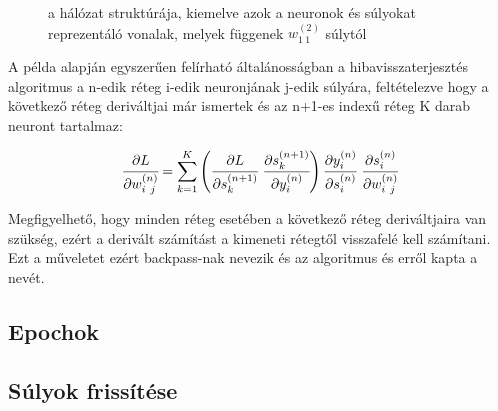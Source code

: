 \begin{figure}[H]
	\caption{a hálózat struktúrája, kiemelve azok a neuronok és súlyokat reprezentáló vonalak, melyek függenek $w^{(2)}_{1~1}$ súlytól \label{w221}}
\end{figure}

A példa alapján egyszerűen felírható általánosságban a hibavisszaterjesztés algoritmus a n-edik réteg i-edik neuronjának j-edik súlyára, feltételezve hogy a következő réteg deriváltjai már ismertek és az n+1-es indexű réteg K darab neuront tartalmaz:

\begin{equation}
    \cfrac{\partial L}{\partial w^{(n)}_{i~j}} = \sum^{K}_{k=1} \left(\cfrac{\partial L}{\partial s^{(n+1)}_k}~\cfrac{\partial s^{(n+1)}_k}{\partial y^{(n)}_i}\right) \cfrac{\partial y^{(n)}_i}{\partial s^{(n)}_i}~\cfrac{\partial s^{(n)}_i}{\partial w^{(n)}_{i~j}} 
\end{equation}

Megfigyelhető, hogy minden réteg esetében a következő réteg deriváltjaira van szükség, ezért a derivált számítást a kimeneti rétegtől visszafelé kell számítani. Ezt a műveletet ezért backpass-nak nevezik és az algoritmus és erről kapta a nevét.

\subsection{Epochok}

\subsection{Súlyok frissítése}

